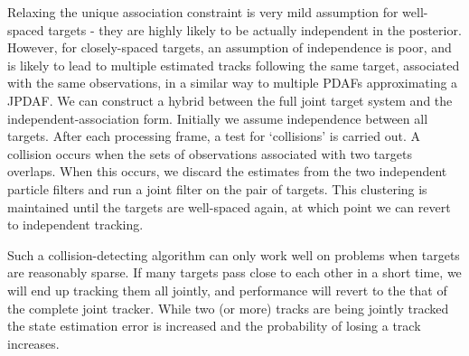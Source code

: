 Relaxing the unique association constraint is very mild assumption for well-spaced targets - they are highly likely to be actually independent in the posterior. However, for closely-spaced targets, an assumption of independence is poor, and is likely to lead to multiple estimated tracks following the same target, associated with the same observations, in a similar way to multiple PDAFs approximating a JPDAF. We can construct a hybrid between the full joint target system and the independent-association form. Initially we assume independence between all targets. After each processing frame, a test for `collisions' is carried out. A collision occurs when the sets of observations associated with two targets overlaps. When this occurs, we discard the estimates from the two independent particle filters and run a joint filter on the pair of targets. This clustering is maintained until the targets are well-spaced again, at which point we can revert to independent tracking.

Such a collision-detecting algorithm can only work well on problems when targets are reasonably sparse. If many targets pass close to each other in a short time, we will end up tracking them all jointly, and performance will revert to the that of the complete joint tracker. While two (or more) tracks are being jointly tracked the state estimation error is increased and the probability of losing a track increases.